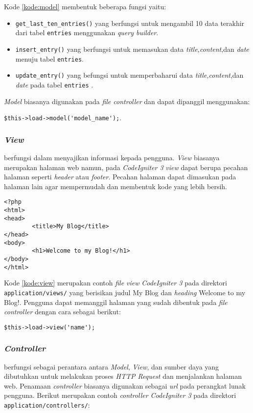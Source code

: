 Kode \ref{kode:model} membentuk beberapa fungsi yaitu:
\begin{itemize}
\item \verb|get_last_ten_entries()| yang berfungsi untuk mengambil 10 data terakhir dari tabel \verb|entries| menggunakan \textit{query builder}.
\item \verb|insert_entry()| yang berfungsi untuk memasukan data \textit{title,content},dan \textit{date} menuju tabel \verb|entries|.
\item \verb|update_entry()| yang befungsi untuk memperbaharui data \textit{title,content},dan \textit{date} pada tabel \verb|entries| .
\end{itemize}
\textit{Model} biasanya digunakan pada \textit{file controller} dan dapat dipanggil menggunakan: 
\begin{center}
\verb|$this->load->model('model_name');|.
\end{center}

\subsubsection{\textit{\textbf{View}}} berfungsi dalam menyajikan informasi kepada pengguna. \textit{View} biasanya merupakan halaman web namun, pada \textit{CodeIgniter 3} \textit{view} dapat berupa pecahan halaman seperti \textit{header} atau \textit{footer}. Pecahan halaman dapat dimasukan pada halaman lain agar mempermudah dan membentuk kode yang lebih bersih.

\begin{lstlisting}[caption=Contoh \textit{view} pada \textit{CodeIgniter 3}, label=kode:view]
<?php
<html>
<head>
        <title>My Blog</title>
</head>
<body>
        <h1>Welcome to my Blog!</h1>
</body>
</html>
\end{lstlisting}

Kode \ref{kode:view} merupakan contoh \textit{file view} \textit{CodeIgniter 3} pada direktori \verb|application/views/| yang berisikan judul My Blog dan \textit{heading} Welcome to my Blog!. Pengguna dapat memanggil halaman yang sudah dibentuk pada \textit{file controller} dengan cara sebagai berikut:

\begin{center}
\verb|$this->load->view('name');|
\end{center}

\subsubsection{\textit{\textbf{Controller}}} berfungsi sebagai perantara antara \textit{Model}, \textit{View}, dan sumber daya yang dibutuhkan untuk melakukan proses \textit{HTTP Request} dan menjalankan halaman web. Penamaan \textit{controller} biasanya digunakan sebagai \textit{url} pada perangkat lunak pengguna. Berikut merupakan contoh \textit{controller} \textit{CodeIgniter 3} pada direktori \verb|application/controllers/|:

